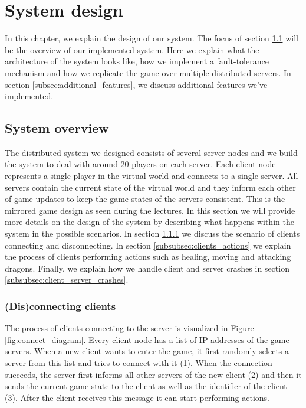 \section{System design}
In this chapter, we explain the design of our system. The focus of section \ref{subsec:system_overview} will be the overview of our implemented system. Here we explain what the architecture of the system looks like, how we implement a fault-tolerance mechanism and how we replicate the game over multiple distributed servers. In section \ref{subsec:additional_features}, we discuss additional features we've implemented.

\subsection{System overview}
\label{subsec:system_overview}
The distributed system we designed consists of several server nodes and we build the system to deal with around 20 players on each server. Each client node represents a single player in the virtual world and connects to a single server. All servers contain the current state of the virtual world and they inform each other of game updates to keep the game states of the servers consistent. This is the mirrored game design as seen during the lectures. In this section we will provide more details on the design of the system by describing what happens within the system in the possible scenarios. In section \ref{subsubsec:disconnecting_clients} we discuss the scenario of clients connecting and disconnecting. In section \ref{subsubsec:clients_actions} we explain the process of clients performing actions such as healing, moving and attacking dragons. Finally, we explain how we handle client and server crashes in section \ref{subsubsec:client_server_crashes}.

\subsubsection{(Dis)connecting clients}
\label{subsubsec:disconnecting_clients}
The process of clients connecting to the server is visualized in Figure \ref{fig:connect_diagram}. Every client node has a list of IP addresses of the game servers. When a new client wants to enter the game, it first randomly selects a server from this list and tries to connect with it (1). When the connection succeeds, the server first informs all other servers of the new client (2) and then it sends the current game state to the client as well as the identifier of the client (3). After the client receives this message it can start performing actions.


